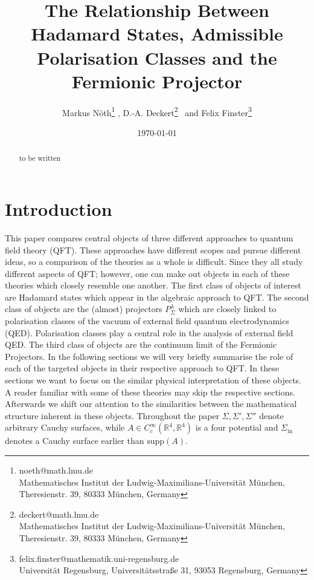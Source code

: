 \documentclass[a4paper,11pt]{article}
\begin{document}
\title{The Relationship Between Hadamard States, Admissible Polarisation Classes and the Fermionic Projector}

\author{Markus Nöth\thanks{noeth@math.lmu.de \\\tiny{Mathematisches Institut der Ludwig-Maximilians-Universit\"at M\"unchen,}
    \tiny{Theresienstr. 39, 80333 M\"unchen, Germany}}
	,
D.-A. Deckert\thanks{deckert@math.lmu.de \\ \tiny{Mathematisches Institut der Ludwig-Maximilians-Universit\"at M\"unchen,}
    \tiny{Theresienstr. 39, 80333 M\"unchen, Germany}}
	 ~and
Felix Finster\thanks{felix.finster@mathematik.uni-regensburg.de \\     \tiny{Universität Regensburg, Universitätsstraße 31, 93053 Regensburg, Germany}}
}
\date{\today}



\maketitle

\begin{abstract}
to be written
\end{abstract}

\section{Introduction}
This paper compares central objects of three different approaches to quantum field theory (QFT).
These approaches have different scopes and pursue different ideas, so a comparison of the theories as a whole is difficult.
Since they all study different aspects of QFT; however, one can make out objects in each of these theories which closely resemble
one another. The first class of objects of interest are Hadamard states which appear in the algebraic approach to 
QFT\cite{fulling1978singularity}. The second class of objects are the (almost) projectors \(P^\lambda_{\Sigma}\) which are 
closely linked to polarisation classes of the vacuum of external field quantum electrodynamics (QED). 
Polarisation classes play a central role in the analysis of external field QED\cite{ivp0, ivp1, ivp2}.
The third class of objects are the continuum limit of the Fermionic Projectors\cite{something}. 
In the following sections we will very briefly summarise the role of each of the targeted objects in their respective approach to QFT. 
In these sections we want to focus on the similar physical interpretation of these objects.
A reader familiar with some of these theories may skip the respective sections. 
Afterwards we shift our attention to the similarities between the mathematical structure inherent in these objects.
Throughout the paper
\(\Sigma, \Sigma', \Sigma''\) denote arbitrary Cauchy surfaces, while \(A\in C_c^\infty(\mathbb{R}^4,\mathbb{R}^4)\) 
is a four potential and \(\Sigma_{\text{in}}\) denotes a Cauchy surface earlier than \(\text{supp}(A)\).
\end{document}
